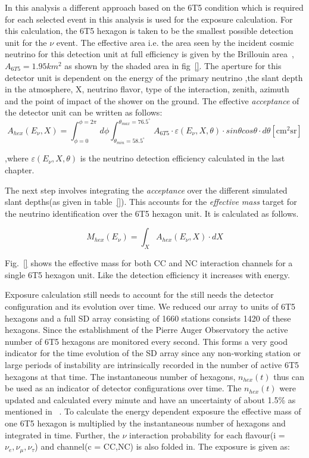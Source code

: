 In this analysis a different approach based on the 6T5 condition which is required for each selected event in this analysis is used for the exposure calculation. For this calculation, the 6T5 hexagon is taken to be the smallest possible detection unit for the $\nu$ event. The effective area i.e. the area seen by the incident cosmic neutrino for this detection unit at full efficiency is given by the Brillouin area~\cite{}, $A_{6T5} = 1.95km^2$ as shown by the shaded area in fig~\ref{}. The aperture for this detector unit is dependent on the energy of the primary neutrino ,the slant depth in the atmosphere, X, neutrino flavor, type of the interaction, zenith, azimuth and the point of impact of the shower on the ground. The effective \textit{acceptance} of the detector unit can be written as follows:
\begin{equation}
  A_{hex}(E_{\nu}, X)  = \int^{\phi = 2\pi}_{\phi = 0} \,d\phi \int_{\theta_{min} = 58.5^{\circ}}^{\theta_{max}= 76.5^{\circ}}  \, A_{6T5} \cdot \varepsilon(E_{\nu}, X, \theta) \cdot sin\theta cos\theta \cdot d\theta    \mathrm{[cm^2 sr]}
\end{equation}

,where $\varepsilon(E_{\nu}, X, \theta)$ is the neutrino detection efficiency calculated in the last chapter. 

The next step involves integrating the \textit{acceptance} over the different simulated slant depths(as given in table~\ref{}). This accounts for the \textit{effective mass} target for the neutrino identification over the 6T5 hexagon unit. It is calculated as follows. 

\begin{equation}
  M_{hex}(E_{\nu}) = \int_X A_{hex}(E_{\nu}, X) \cdot dX
\end{equation}

Fig.~\ref{} shows the effective mass for both CC and NC interaction channels for a single 6T5 hexagon unit. Like the detection efficiency it increases with energy. 

Exposure calculation still needs to account for the still needs the detector configuration and its evolution over time. We reduced our array to units of 6T5 hexagons and a full SD array consisting of 1660 stations consists 1420 of these hexagons. Since the establishment of the Pierre Auger Observatory the active number of 6T5 hexagons are monitored every second. This forms a very good indicator for the time evolution of the SD array since any non-working station or large periods of instability are intrinsically recorded in the number of active 6T5 hexagons at that time. The instantaneous number of hexagons, $n_{hex}(t)$ thus can be used as an indicator of detector configurations over time. The $n_{hex}(t)$ were updated and calculated every minute and have an uncertainty of about 1.5\% as mentioned in ~\cite{}. To calculate the energy dependent exposure the effective mass of one 6T5 hexagon is multiplied by the instantaneous number of hexagons and integrated in time. Further, the $\nu$ interaction probability for each flavour(i = $\nu_e, \nu_{\mu}, \nu_{\tau}$) and channel(c = CC,NC) is also folded in. The exposure is given as:

